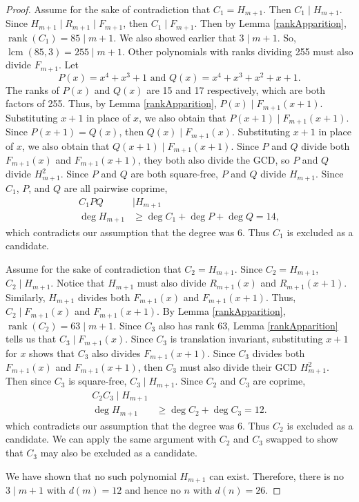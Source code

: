 \documentclass[a4paper]{article}
\begin{document}
\begin{proof}
		Assume for the sake of contradiction that $C_1 = H_{m+1}$.
		Then $C_1 \mid H_{m+1}$.
		Since $H_{m+1} \mid R_{m+1} \mid F_{m+1}$, then $C_1 \mid F_{m+1}$.
		Then by Lemma \ref{rankApparition}, $\operatorname{rank}(C_1) = 85 \mid m+1$.
		We also showed earlier that $3 \mid m+1$.
		So, $\operatorname{lcm}{(85,3)} = 255 \mid m+1$.
		Other polynomials with ranks dividing 255 must also divide $F_{m+1}$.
		Let
		\begin{equation*}
			P(x) = x^4 + x^3 + 1 \text{ and } Q(x) = x^4 + x^3 + x^2 + x + 1.
		\end{equation*}
		The ranks of $P(x)$ and $Q(x)$ are 15 and 17 respectively, which are both factors of 255.
		Thus, by Lemma \ref{rankApparition}, $P(x) \mid F_{m+1}(x+1)$.
		Substituting $x+1$ in place of $x$, we also obtain that $P(x+1) \mid F_{m+1}(x+1)$.
		Since $P(x+1) = Q(x)$, then $Q(x) \mid F_{m+1}(x)$.
		Substituting $x+1$ in place of $x$, we also obtain that $Q(x+1) \mid F_{m+1}(x+1)$.
		Since $P$ and $Q$ divide both $F_{m+1}(x)$ and $F_{m+1}(x+1)$, they both also divide the GCD, so $P$ and $Q$ divide $H_{m+1}^2$.
		Since $P$ and $Q$ are both square-free, $P$ and $Q$ divide $H_{m+1}$.
		Since $C_1$, $P$, and $Q$ are all pairwise coprime,
		\begin{align*}
			C_1 P Q &\mid H_{m+1} \\
			\deg{H_{m+1}} &\geq \deg{C_1} + \deg{P} + \deg{Q} = 14,
		\end{align*}
		which contradicts our assumption that the degree was 6.
		Thus $C_1$ is excluded as a candidate.
	
		Assume for the sake of contradiction that $C_2 = H_{m+1}$.
		Since $C_2 = H_{m+1}$, $C_2 \mid H_{m+1}$.
		Notice that $H_{m+1}$ must also divide $R_{m+1}(x)$ and $R_{m+1}(x+1)$.
		Similarly, $H_{m+1}$ divides both $F_{m+1}(x)$ and $F_{m+1}(x+1)$.
		Thus, $C_2 \mid F_{m+1}(x)$ and $F_{m+1}(x+1)$.
		By Lemma \ref{rankApparition}, $\operatorname{rank}(C_2) = 63 \mid m+1$.
		Since $C_3$ also has rank 63, Lemma \ref{rankApparition} tells us that $C_3 \mid F_{m+1}(x)$.
		Since $C_3$ is translation invariant, substituting $x+1$ for $x$ shows that $C_3$ also divides $F_{m+1}(x+1)$.
		Since $C_3$ divides both $F_{m+1}(x)$ and $F_{m+1}(x+1)$, then $C_3$ must also divide their GCD $H_{m+1}^2$.
		Then since $C_3$ is square-free, $C_3 \mid H_{m+1}$.
		Since $C_2$ and $C_3$ are coprime,
		\begin{align*}
			C_2 C_3 \mid H_{m+1} \\
			\deg{H_{m+1}} &\geq \deg{C_2} + \deg{C_3} = 12.
		\end{align*}
		which contradicts our assumption that the degree was 6.
		Thus $C_2$ is excluded as a candidate.
		We can apply the same argument with $C_2$ and $C_3$ swapped to show that $C_3$ may also be excluded as a candidate.
		
		We have shown that no such polynomial $H_{m+1}$ can exist.
		Therefore, there is no $3 \mid m+1$ with $d(m) = 12$ and hence no $n$ with $d(n) = 26$.
	\end{proof}
\end{document}
